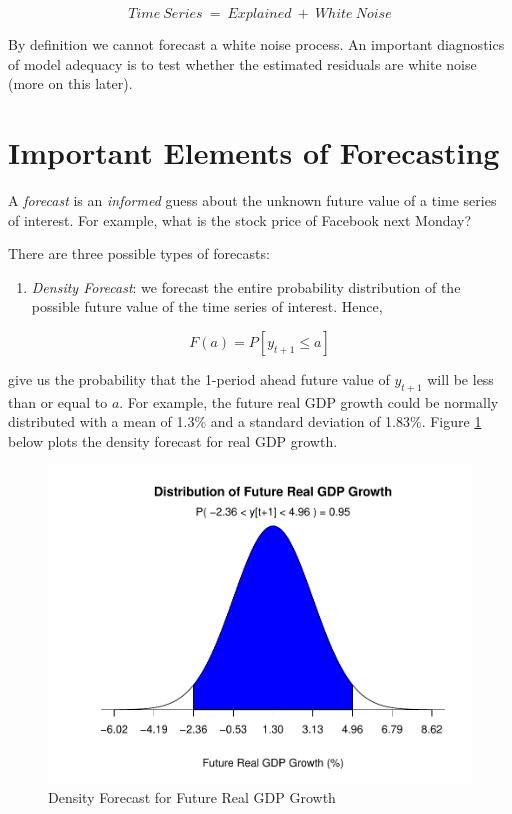 \documentclass[]{book}
\providecommand{\tightlist}{%
  \setlength{\itemsep}{0pt}\setlength{\parskip}{0pt}}
\theoremstyle{definition}
\theoremstyle{definition}
\theoremstyle{definition}
\theoremstyle{remark}
\let\BeginKnitrBlock\begin \let\EndKnitrBlock\end
\begin{document}
\begin{equation}
Time \ Series \ = \  Explained  \ + \ White \ Noise
\end{equation}

By definition we cannot forecast a white noise process. An important diagnostics of model adequacy is to test whether the estimated residuals are white noise (more on this later).

\hypertarget{important-elements-of-forecasting}{%
\section{Important Elements of Forecasting}\label{important-elements-of-forecasting}}

\BeginKnitrBlock{definition}[Forecast]
\protect\hypertarget{def:d1}{}{\label{def:d1} {} }
\EndKnitrBlock{definition}

A \emph{forecast} is an \emph{informed} guess about the unknown future value of a time series of interest. For example, what is the stock price of Facebook next Monday?

There are three possible types of forecasts:

\begin{enumerate}
\def\labelenumi{\arabic{enumi}.}
\tightlist
\item
  \emph{Density Forecast}: we forecast the entire probability distribution of the possible future value of the time series of interest. Hence,
\end{enumerate}

\begin{equation}
F(a)=P[y_{t+1}\leq a]
\end{equation}

give us the probability that the 1-period ahead future value of \(y_{t+1}\) will be less than or equal to \(a\). For example, the future real GDP growth could be normally distributed with a mean of 1.3\% and a standard deviation of 1.83\%. Figure \ref{fig:ch1-figure3} below plots the density forecast for real GDP growth.

\begin{figure}

{\centering \includegraphics[width=0.8\linewidth]{bookdown-demo_files/figure-latex/ch1-figure3-1} 

}

\caption{Density Forecast for Future Real GDP Growth}\label{fig:ch1-figure3}
\end{figure}
\end{document}
